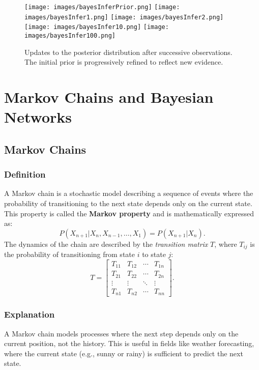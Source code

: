 \documentclass[12pt,a4paper]{article}
\begin{document}
\begin{figure}[h!]
    \centering
    \texttt{[image: images/bayesInferPrior.png]}
    \texttt{[image: images/bayesInfer1.png]}
    \texttt{[image: images/bayesInfer2.png]}
    \texttt{[image: images/bayesInfer10.png]}
    \texttt{[image: images/bayesInfer100.png]}
    \caption{Updates to the posterior distribution after successive observations. The initial prior is progressively refined to reflect new evidence.}
    \label{fig:posterior_updates}
\end{figure}



\section{Markov Chains and Bayesian Networks}

\subsection{Markov Chains}
\subsubsection{Definition}
A Markov chain is a stochastic model describing a sequence of events where the probability of transitioning to the next state depends only on the current state. This property is called the \textbf{Markov property} and is mathematically expressed as:
\[
P(X_{n+1} | X_n, X_{n-1}, \ldots, X_1) = P(X_{n+1} | X_n).
\]
The dynamics of the chain are described by the \textit{transition matrix} $T$, where $T_{ij}$ is the probability of transitioning from state $i$ to state $j$:
\[
T = \begin{bmatrix}
T_{11} & T_{12} & \cdots & T_{1n} \\
T_{21} & T_{22} & \cdots & T_{2n} \\
\vdots & \vdots & \ddots & \vdots \\
T_{n1} & T_{n2} & \cdots & T_{nn}
\end{bmatrix}.
\]

\subsubsection{Explanation}
A Markov chain models processes where the next step depends only on the current position, not the history. This is useful in fields like weather forecasting, where the current state (e.g., sunny or rainy) is sufficient to predict the next state.
\end{document}
